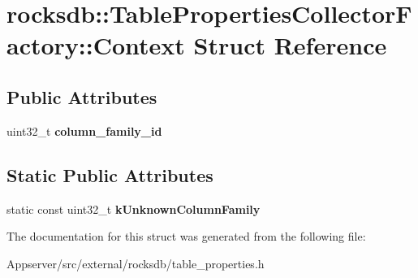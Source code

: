 \hypertarget{structrocksdb_1_1TablePropertiesCollectorFactory_1_1Context}{}\section{rocksdb\+:\+:Table\+Properties\+Collector\+Factory\+:\+:Context Struct Reference}
\label{structrocksdb_1_1TablePropertiesCollectorFactory_1_1Context}
\subsection*{Public Attributes}
\begin{DoxyCompactItemize}
\item 
uint32\+\_\+t {\bfseries column\+\_\+family\+\_\+id}\hypertarget{structrocksdb_1_1TablePropertiesCollectorFactory_1_1Context_a9079b7a97df27b529a6a846aeee891ef}{}\label{structrocksdb_1_1TablePropertiesCollectorFactory_1_1Context_a9079b7a97df27b529a6a846aeee891ef}

\end{DoxyCompactItemize}
\subsection*{Static Public Attributes}
\begin{DoxyCompactItemize}
\item 
static const uint32\+\_\+t {\bfseries k\+Unknown\+Column\+Family}\hypertarget{structrocksdb_1_1TablePropertiesCollectorFactory_1_1Context_a1ec38edd1a3bc1ea7a5e6100b0bd8e46}{}\label{structrocksdb_1_1TablePropertiesCollectorFactory_1_1Context_a1ec38edd1a3bc1ea7a5e6100b0bd8e46}

\end{DoxyCompactItemize}


The documentation for this struct was generated from the following file\+:\begin{DoxyCompactItemize}
\item 
Appserver/src/external/rocksdb/table\+\_\+properties.\+h\end{DoxyCompactItemize}
